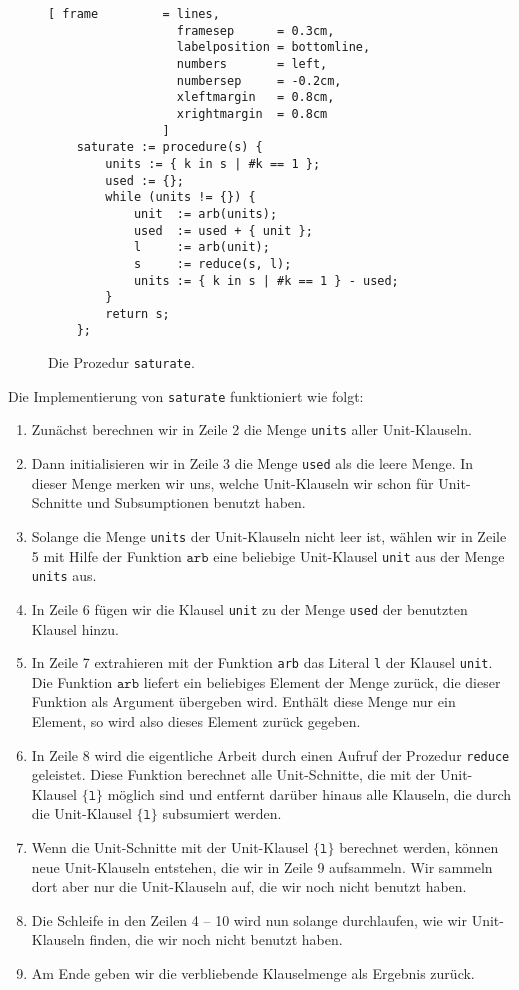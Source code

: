 \begin{figure}[!ht]
  \centering
\begin{Verbatim}[ frame         = lines, 
                  framesep      = 0.3cm, 
                  labelposition = bottomline,
                  numbers       = left,
                  numbersep     = -0.2cm,
                  xleftmargin   = 0.8cm,
                  xrightmargin  = 0.8cm
                ]
    saturate := procedure(s) {
        units := { k in s | #k == 1 };
        used := {};
        while (units != {}) {
            unit  := arb(units);
            used  := used + { unit };
            l     := arb(unit);
            s     := reduce(s, l);
            units := { k in s | #k == 1 } - used;        
        }
        return s;
    };
\end{Verbatim}
\vspace*{-0.3cm}
  \caption{Die Prozedur \texttt{saturate}.}
  \label{fig:saturate}
\end{figure} 
Die Implementierung von \texttt{saturate} funktioniert wie folgt: 
\begin{enumerate}
\item Zun\"{a}chst berechnen wir in Zeile 2 die Menge \texttt{units} aller Unit-Klauseln.  
\item Dann initialisieren wir in Zeile 3 die Menge \texttt{used} als die leere Menge.
      In dieser Menge merken wir uns, welche Unit-Klauseln wir schon f\"{u}r Unit-Schnitte und
      Subsumptionen benutzt haben.
\item Solange die Menge \texttt{units} der Unit-Klauseln nicht leer ist, w\"{a}hlen wir in Zeile 5
      mit Hilfe der Funktion $\mathtt{arb}$ eine beliebige Unit-Klausel \texttt{unit} aus der Menge
      \texttt{units} aus. 
\item In Zeile 6 f\"{u}gen wir die Klausel \texttt{unit} zu der Menge
      \texttt{used} der benutzten Klausel hinzu.  
\item In Zeile 7 extrahieren mit der Funktion \texttt{arb} das Literal \texttt{l} der Klausel
      \texttt{unit}.  Die Funktion $\mathtt{arb}$ liefert ein beliebiges Element der Menge zur\"{u}ck,
      die dieser Funktion als Argument \"{u}bergeben wird.  Enth\"{a}lt diese Menge nur ein Element, so
      wird also dieses Element zur\"{u}ck gegeben.
\item In Zeile 8 wird  die eigentliche Arbeit durch einen Aufruf der Prozedur
      \texttt{reduce} geleistet.  Diese Funktion berechnet alle Unit-Schnitte, die mit der
      Unit-Klausel $\{\texttt{l}\}$ m\"{o}glich sind und entfernt dar\"{u}ber hinaus alle Klauseln, die
      durch die Unit-Klausel $\{\texttt{l}\}$ subsumiert werden.
\item Wenn die Unit-Schnitte mit der Unit-Klausel $\{\texttt{l}\}$ berechnet werden, k\"{o}nnen neue
      Unit-Klauseln entstehen, die wir in Zeile 9 aufsammeln.  Wir sammeln dort aber nur die Unit-Klauseln auf,
       die wir noch nicht benutzt haben. 
\item Die Schleife in den Zeilen 4 -- 10 wird nun solange durchlaufen, wie wir 
      Unit-Klauseln finden, die wir noch nicht benutzt haben.
\item Am Ende geben wir die verbliebende Klauselmenge als Ergebnis zur\"{u}ck.
\end{enumerate}
